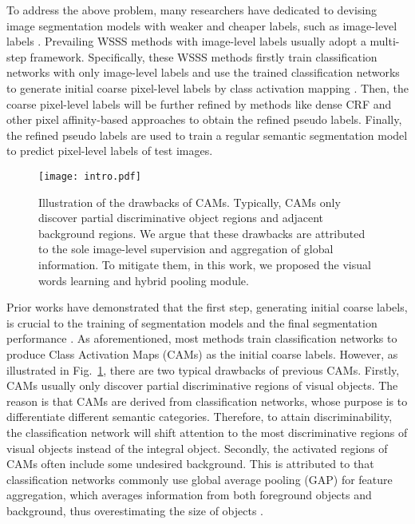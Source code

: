 \par To address the above problem, many researchers have dedicated to devising image segmentation models with weaker and cheaper labels, such as image-level labels \citep{papandreou2015weakly,pinheiro2015image,ahn2018learning,lee2021anti}. Prevailing WSSS methods with image-level labels usually adopt a multi-step framework. Specifically, these WSSS methods firstly train classification networks with only image-level labels and use the trained classification networks to generate initial coarse pixel-level labels by class activation mapping \citep{zhou2016learning}. Then, the coarse pixel-level labels will be further refined by methods like dense CRF \citep{krahenbuhl2011efficient} and other pixel affinity-based approaches \citep{ahn2018learning,ahn2019weakly} to obtain the refined pseudo labels. Finally, the refined pseudo labels are used to train a regular semantic segmentation model to predict pixel-level labels of test images.

\begin{figure}[tbp]
  \centering
  \texttt{[image: intro.pdf]}
  \caption{Illustration of the drawbacks of CAMs. Typically, CAMs only discover partial discriminative object regions and adjacent background regions. We argue that these drawbacks are attributed to the sole image-level supervision and aggregation of global information. To mitigate them, in this work, we proposed the visual words learning and hybrid pooling module.}
  \label{fig_cam}
\end{figure}

\par Prior works have demonstrated that the first step, \ie generating initial coarse labels, is crucial to the training of segmentation models and the final segmentation performance \citep{wang2020self,chang2020weakly,lee2021anti}. As aforementioned, most methods train classification networks to produce Class Activation Maps (CAMs) \citep{zhou2016learning} as the initial coarse labels.
However, as illustrated in Fig.~\ref{fig_cam}, there are two typical drawbacks of previous CAMs. Firstly, CAMs usually only discover partial discriminative regions of visual objects. The reason is that CAMs are derived from classification networks, whose purpose is to differentiate different semantic categories. Therefore, to attain discriminability, the classification network will shift attention to the most discriminative regions of visual objects instead of the integral object. Secondly, the activated regions of CAMs often include some undesired background. This is attributed to that classification networks commonly use global average pooling (GAP) \citep{lin2013network} for feature aggregation, which averages information from both foreground objects and background, thus overestimating the size of objects \citep{zhou2016learning}.

